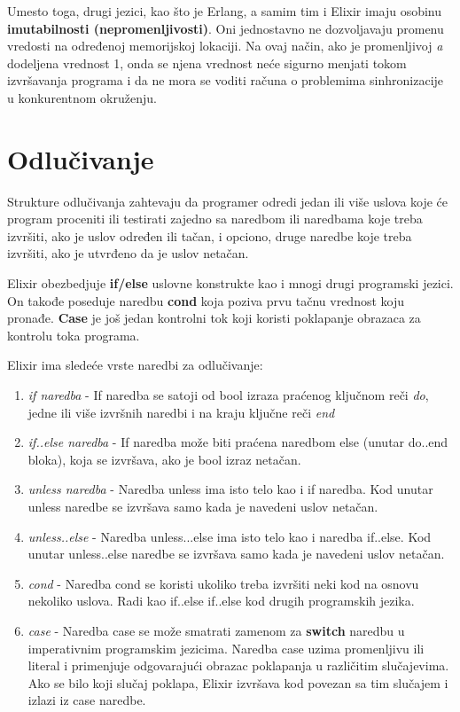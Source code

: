 \documentclass[12pt,oneside]{memoir}
\begin{document}
Umesto toga, drugi jezici, kao što je Erlang, a samim tim i Elixir imaju osobinu \textbf{imutabilnosti (nepromenljivosti)}. Oni jednostavno ne dozvoljavaju promenu vredosti na određenoj memorijskoj lokaciji. Na ovaj način, ako je promenljivoj \textit{a} dodeljena vrednost 1, onda se njena vrednost neće sigurno menjati tokom izvršavanja programa i da ne mora se voditi računa o problemima sinhronizacije u konkurentnom okruženju.

\newpage

\section{Odlučivanje}

Strukture odlučivanja zahtevaju da programer odredi jedan ili više uslova koje će program proceniti ili testirati zajedno sa naredbom ili naredbama koje treba izvršiti, ako je uslov određen ili tačan, i opciono, druge naredbe koje treba izvršiti, ako je utvrđeno da je uslov netačan.

Elixir obezbedjuje \textbf{if/else} uslovne konstrukte kao i mnogi drugi programski jezici. On takođe poseduje naredbu \textbf{cond} koja poziva prvu tačnu vrednost koju pronađe. \textbf{Case} je još jedan kontrolni tok koji koristi poklapanje obrazaca za kontrolu toka programa.

Elixir ima sledeće vrste naredbi za odlučivanje:

\begin{enumerate}
    \item{\textit{if naredba} - If naredba se satoji od bool izraza praćenog ključnom reči \textit{do}, jedne ili više izvršnih naredbi i na kraju ključne reči \textit{end}}
    \item{\textit{if..else naredba} - If naredba može biti praćena naredbom else (unutar do..end bloka), koja se izvršava, ako je bool izraz netačan.}
    \item{\textit{unless naredba} - Naredba unless ima isto telo kao i if naredba. Kod unutar unless naredbe se izvršava samo kada je navedeni uslov netačan.}
    \item{\textit{unless..else} - Naredba unless...else ima isto telo kao i naredba if..else. Kod unutar unless..else naredbe se izvršava samo kada je navedeni uslov netačan.}
    \item{\textit{cond} - Naredba cond se koristi ukoliko treba izvršiti neki kod na osnovu nekoliko uslova. Radi kao if..else if..else kod drugih programskih jezika.}
    \item{\textit{case} - Naredba case  se može smatrati zamenom za \textbf{switch} naredbu u imperativnim programskim jezicima. Naredba case uzima promenljivu ili literal i primenjuje odgovarajući obrazac poklapanja u različitim slučajevima. Ako se bilo koji slučaj poklapa, Elixir izvršava kod povezan sa tim slučajem i izlazi iz case naredbe.}
\end{enumerate}
\end{document}
